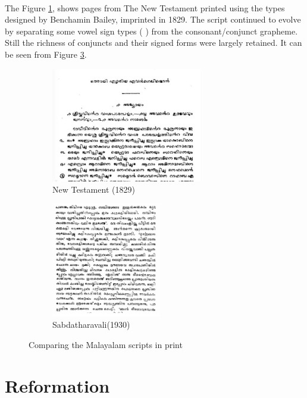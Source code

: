 \documentclass[10pt]{article}
\begin{document}
\paragraph{}
The Figure \ref{newtestament}, shows pages from The New Testament printed using the types designed by Benchamin Bailey, imprinted in 1829.\cite{babucherian} The script continued to evolve by separating some vowel sign types (\begingroup {} \endgroup) from the consonant/conjunct grapheme. Still the richness of conjuncts and their signed forms were largely retained. It can be seen from Figure \ref{Sabdatharavali}. 


\begin{figure}
\begin{subfigure}{.5\textwidth}
  \centering
  \includegraphics[width=\linewidth, height=5cm]{images/newtestament1829.png}
  \caption{New Testament (1829)}
  \label{newtestament}
\end{subfigure}%
\begin{subfigure}{.5\textwidth}
  \centering
  \includegraphics[width=\linewidth,height=5cm]{images/1930-Sabdatharavali.png}
  \caption{Sabdatharavali(1930)}
  \label{Sabdatharavali}
\end{subfigure}
\caption{Comparing the Malayalam scripts in print}
\end{figure}


\section{Reformation}
\end{document}

